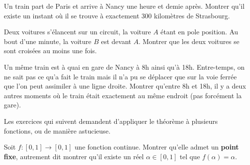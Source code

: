 \begin{exo}
Un train part de Paris et arrive à Nancy une heure et demie après. Montrer qu'il existe un instant où il se trouve à exactement 300 kilomètres de Strasbourg.
\end{exo}

\begin{exo}
Deux voitures s'élancent sur un circuit, la voiture $A$ étant en \og pole position\fg. Au bout d'une minute, la voiture $B$ est devant $A$.  Montrer que les deux voitures se sont croisées au moins une fois.
\begin{comment}
Soient $f$ et $g$ des fonctions continues  de $[0,1]$ dans $\R$. On suppose que $f(0)\leq g(0)$ et que $f(1) \geq g(1)$. Montrer qu'il existe un réel $\alpha \in [0,1]$ tel que $f(\alpha)=g(\alpha)$.
\end{comment}
\end{exo}

\begin{exo}
Un même train est à quai en gare de Nancy à 8h ainsi qu'à 18h. Entre-temps, on ne sait pas ce qu'a fait le train mais il n'a pu se déplacer que sur la voie ferrée que l'on peut assimiler à une ligne droite. Montrer qu'entre 8h et 18h, il y a deux autres moments où le train était exactement au même endroit (pas forcément la gare).
\begin{comment}
Soit $f : [0,1] \to \R$ une fonction continue vérifiant $f(0)=f(1)$. Montrer qu'il existe $a$ et $b$ distincts dans $]0,1[$ tels que $f(a)=f(b)$.
\end{comment}
\end{exo}


Les exercices qui suivent demandent d'appliquer le théorème à plusieurs fonctions, ou de manière astucieuse.

\begin{exo}
Soit $f : [0,1] \to [0,1] $ une fonction continue. Montrer qu'elle admet un \textbf{point fixe}, autrement dit montrer qu'il existe un réel $\alpha \in [0,1]$ tel que $f(\alpha)=\alpha$.
\end{exo}



